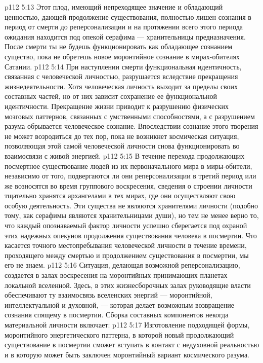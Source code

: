 \vs p112 5:13 Этот плод, имеющий непреходящее значение и обладающий ценностью, дающей продолжение существования, полностью лишен сознания в период от смерти до реперсонализации и на протяжении всего этого периода ожидания находится под опекой серафима --- хранительницы предназначения. После смерти ты не будешь функционировать как обладающее сознанием существо, пока не обретешь новое моронтийное сознание в мирах\hyp{}обителях Сатании.
\vs p112 5:14 При наступлении смерти функциональная идентичность, связанная с человеческой личностью, разрушается вследствие прекращения жизнедеятельности. Хотя человеческая личность выходит за пределы своих составных частей, но от них зависит сохранение ее функциональной идентичности. Прекращение жизни приводит к разрушению физических мозговых паттернов, связанных с умственными способностями, а с разрушением разума обрывается человеческое сознание. Впоследствии сознание этого творения не может возродиться до тех пор, пока не возникнет космическая ситуация, позволяющая этой самой человеческой личности снова функционировать во взаимосвязи с живой энергией.
\vs p112 5:15 \pc В течение перехода продолжающих посмертное существование людей из их первоначального мира в миры\hyp{}обители, независимо от того, подвергаются ли они реперсонализации в третий период или же возносятся во время группового воскресения, сведения о строении личности тщательно хранятся архангелами в тех мирах, где они осуществляют свою особую деятельность. Эти существа не являются хранителями личности (подобно тому, как серафимы являются хранительницами души), но тем не менее верно то, что каждый опознаваемый фактор личности успешно сберегается под охраной этих надежных опекунов продолжения существования человека в посмертии. Что касается точного местопребывания человеческой личности в течение времени, проходящего между смертью и продолжением существования в посмертии, мы его не знаем.
\vs p112 5:16 \pc Ситуация, делающая возможной реперсонализацию, создается в залах воскресения на моронтийных принимающих планетах локальной вселенной. Здесь, в этих жизнесборочных залах руководящие власти обеспечивают ту взаимосвязь вселенских энергий --- моронтийной, интеллектуальной и духовной, --- которая делает возможным возвращение сознания спящему в посмертии. Сборка составных компонентов некогда материальной личности включает:
\vs p112 5:17 \bibnobreakspace Изготовление подходящей формы, моронтийного энергетического паттерна, в которой новый продолжающий существование в посмертии сможет вступать в контакт с недуховной реальностью и в которую может быть заключен моронтийный вариант космического разума.
